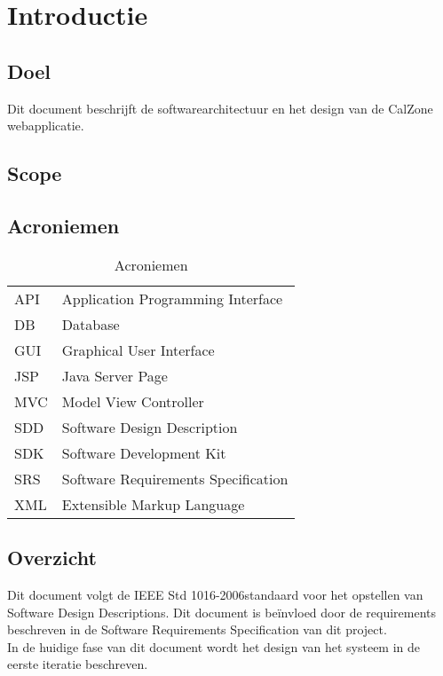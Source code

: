 \chapter{Introductie}

\section{Doel}
Dit document beschrijft de softwarearchitectuur en het design van de CalZone webapplicatie.
\section{Scope}

\section{Acroniemen}

\begin{table}[H]
	\centering
	\caption{Acroniemen}
	\label{tab:Acroniemen}
	\begin{tabular}{l | l}
	
	API	& Application Programming Interface\\

	DB	& Database\\

	GUI	& Graphical User Interface\\

	JSP & Java Server Page\\

	MVC & Model View Controller\\ 

	SDD	& Software Design Description\\

	SDK	& Software Development Kit\\

	SRS	& Software Requirements Specification\\
	
	XML & Extensible Markup Language\\
	
	\end{tabular}
\end{table}


\section{Overzicht}
Dit document volgt de IEEE Std 1016-2006\texttrademark \space standaard voor het opstellen van Software Design Descriptions. 
Dit document is be\"{i}nvloed door de requirements beschreven in de Software Requirements Specification van dit project.\\ In de huidige fase van dit document wordt het design van het systeem in de eerste iteratie beschreven. 
